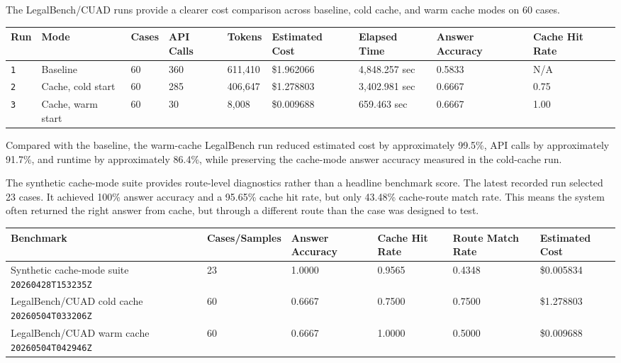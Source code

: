\documentclass[10pt,a4paper]{article}
\begin{document}
The LegalBench/CUAD runs provide a clearer cost comparison across baseline, cold cache, and warm cache modes on 60 cases.

\begin{longtable}{@{}p{}p{}p{}p{}p{}p{}p{}p{}p{}@{}}
\toprule
\textbf{Run} & \textbf{Mode} & \textbf{Cases} & \textbf{API Calls} & \textbf{Tokens} & \textbf{Estimated Cost} & \textbf{Elapsed Time} & \textbf{Answer Accuracy} & \textbf{Cache Hit Rate} \\
\midrule
\endhead
\texttt{1} & Baseline & 60 & 360 & 611,410 & \$1.962066 & 4,848.257 sec & 0.5833 & N/A \\
\texttt{2} & Cache, cold start & 60 & 285 & 406,647 & \$1.278803 & 3,402.981 sec & 0.6667 & 0.75 \\
\texttt{3} & Cache, warm start & 60 & 30 & 8,008 & \$0.009688 & 659.463 sec & 0.6667 & 1.00 \\
\bottomrule
\end{longtable}

Compared with the baseline, the warm-cache LegalBench run reduced estimated cost by approximately 99.5\%, API calls by approximately 91.7\%, and runtime by approximately 86.4\%, while preserving the cache-mode answer accuracy measured in the cold-cache run.

The synthetic cache-mode suite provides route-level diagnostics rather than a headline benchmark score. The latest recorded run selected 23 cases. It achieved 100\% answer accuracy and a 95.65\% cache hit rate, but only 43.48\% cache-route match rate. This means the system often returned the right answer from cache, but through a different route than the case was designed to test.

\begin{longtable}{@{}p{}p{}p{}p{}p{}p{}@{}}
\toprule
\textbf{Benchmark} & \textbf{Cases/Samples} & \textbf{Answer Accuracy} & \textbf{Cache Hit Rate} & \textbf{Route Match Rate} & \textbf{Estimated Cost} \\
\midrule
\endhead
Synthetic cache-mode suite \texttt{20260428T153235Z} & 23 & 1.0000 & 0.9565 & 0.4348 & \$0.005834 \\
LegalBench/CUAD cold cache \texttt{20260504T033206Z} & 60 & 0.6667 & 0.7500 & 0.7500 & \$1.278803 \\
LegalBench/CUAD warm cache \texttt{20260504T042946Z} & 60 & 0.6667 & 1.0000 & 0.5000 & \$0.009688 \\
\bottomrule
\end{longtable}
\end{document}
